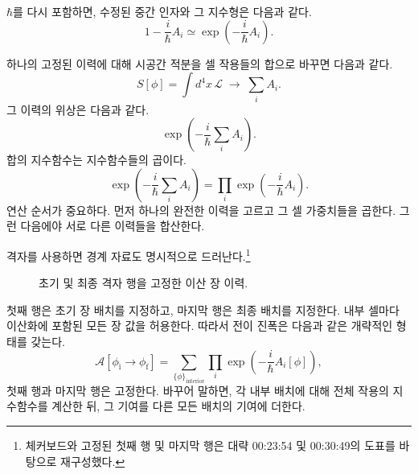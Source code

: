 \(\hbar\)를 다시 포함하면, 수정된 중간 인자와 그 지수형은 다음과 같다.\begin{equation}
1-\frac{i}{\hbar}A_i
\simeq
\exp\!\left(-\frac{i}{\hbar}A_i\right).
\end{equation}

하나의 고정된 이력에 대해 시공간 적분을 셀 작용들의 합으로 바꾸면 다음과 같다.\begin{equation}
S[\phi]
=\int d^4x\,\mathcal{L}
\;\longrightarrow\;
\sum_i A_i.
\end{equation}그 이력의 위상은 다음과 같다.\begin{equation}
\exp\!\left(-\frac{i}{\hbar}\sum_i A_i\right).
\end{equation}합의 지수함수는 지수함수들의 곱이다.\begin{equation}
\exp\!\left(-\frac{i}{\hbar}\sum_i A_i\right)
=
\prod_i\exp\!\left(-\frac{i}{\hbar}A_i\right).
\end{equation}연산 순서가 중요하다. 먼저 하나의 완전한 이력을 고르고 그 셀 가중치들을 곱한다. 그런 다음에야 서로 다른 이력들을 합산한다.

격자를 사용하면 경계 자료도 명시적으로 드러난다.\footnote{체커보드와 고정된 첫째 행 및 마지막 행은 대략 00:23:54 및 00:30:49의 도표를 바탕으로 재구성했다.}
\begin{figure}[htbp]
\centering
{}
\caption{초기 및 최종 격자 행을 고정한 이산 장 이력.}
\end{figure}

첫째 행은 초기 장 배치를 지정하고, 마지막 행은 최종 배치를 지정한다. 내부 셀마다 이산화에 포함된 모든 장 값을 허용한다. 따라서 전이 진폭은 다음과 같은 개략적인 형태를 갖는다.\begin{equation}
\mathcal{A}\!\left[\phi_{\mathrm{i}}\rightarrow\phi_{\mathrm{f}}\right]
=
\sum_{\{\phi\}_{\mathrm{interior}}}
\prod_i\exp\!\left(-\frac{i}{\hbar}A_i[\phi]\right),
\end{equation}첫째 행과 마지막 행은 고정한다. 바꾸어 말하면, 각 내부 배치에 대해 전체 작용의 지수함수를 계산한 뒤, 그 기여를 다른 모든 배치의 기여에 더한다.

